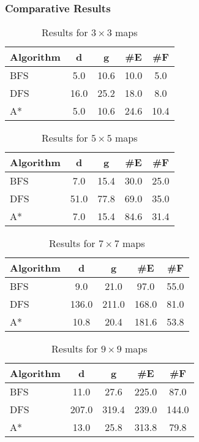 \documentclass[11pt,a4paper]{article}
\begin{document}
\subsubsection{Comparative Results}

\begin{table}[H]
\centering
\caption{Results for $3\times3$ maps}
\begin{tabular}{lcccc}
\toprule
\textbf{Algorithm} & \textbf{d} & \textbf{g} & \textbf{\#E} & \textbf{\#F} \\
\midrule
BFS & 5.0 & 10.6 & 10.0 & 5.0 \\
DFS & 16.0 & 25.2 & 18.0 & 8.0 \\
A* & 5.0 & 10.6 & 24.6 & 10.4 \\
\bottomrule
\end{tabular}
\end{table}

\begin{table}[H]
\centering
\caption{Results for $5\times5$ maps}
\begin{tabular}{lcccc}
\toprule
\textbf{Algorithm} & \textbf{d} & \textbf{g} & \textbf{\#E} & \textbf{\#F} \\
\midrule
BFS & 7.0 & 15.4 & 30.0 & 25.0 \\
DFS & 51.0 & 77.8 & 69.0 & 35.0 \\
A* & 7.0 & 15.4 & 84.6 & 31.4 \\
\bottomrule
\end{tabular}
\end{table}

\begin{table}[H]
\centering
\caption{Results for $7\times7$ maps}
\begin{tabular}{lcccc}
\toprule
\textbf{Algorithm} & \textbf{d} & \textbf{g} & \textbf{\#E} & \textbf{\#F} \\
\midrule
BFS & 9.0 & 21.0 & 97.0 & 55.0 \\
DFS & 136.0 & 211.0 & 168.0 & 81.0 \\
A* & 10.8 & 20.4 & 181.6 & 53.8 \\
\bottomrule
\end{tabular}
\end{table}

\begin{table}[H]
\centering
\caption{Results for $9\times9$ maps}
\begin{tabular}{lcccc}
\toprule
\textbf{Algorithm} & \textbf{d} & \textbf{g} & \textbf{\#E} & \textbf{\#F} \\
\midrule
BFS & 11.0 & 27.6 & 225.0 & 87.0 \\
DFS & 207.0 & 319.4 & 239.0 & 144.0 \\
A* & 13.0 & 25.8 & 313.8 & 79.8 \\
\bottomrule
\end{tabular}
\end{table}
\end{document}
